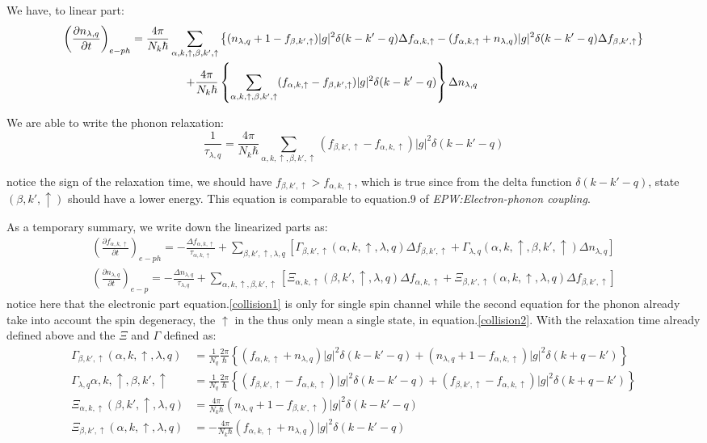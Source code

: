 \documentclass{article}
\newcommand{\pfrac}[2]{\frac{\partial #1}{\partial #2}}
\newcommand{\fak}{f_{\alpha,k,\uparrow}}
\newcommand{\fbk}{f_{\beta,k',\uparrow}}
\newcommand{\nlq}{n_{\lambda,q}}
\newcommand{\ak}{\alpha,k,\uparrow}
\newcommand{\bk}{\beta,k',\uparrow}
\newcommand{\ql}{\lambda,q}
\begin{document}
We have, to linear part:
\begin{align}
    \left(\pfrac{\nlq}{t}\right)_{e-ph} = \frac{4\pi}{N_k\hbar}\sum_{\ak,\bk} & \left\{ (\nlq+1-\fbk)|g|^2\delta(k-k'-q)\Delta\fak - (\fak+\nlq)|g|^2\delta(k-k'-q)\Delta\fbk \right\} \notag \\
                    +\frac{4\pi}{N_k\hbar}& \left\{ \sum_{\ak,\bk}(\fak-\fbk)|g|^2\delta(k-k'-q) \right\} \Delta\nlq
\end{align}

We are able to write the phonon relaxation:
\begin{equation}
    \frac{1}{\tau_{\ql}} = \frac{4\pi}{N_k\hbar} \sum_{\ak,\bk}(\fbk-\fak)|g|^2\delta(k-k'-q) 
\end{equation}

notice the sign of the relaxation time, we should have $\fbk > \fak$, which is true since from the delta function $\delta(k-k'-q)$, 
state $(\bk)$ should have a lower energy. This equation is comparable to equation.9 of \emph{EPW:Electron-phonon coupling}. 

As a temporary summary, we write down the linearized parts as:
\begin{align}
    \left(\pfrac{\fak}{t}\right)_{e-ph} = - \frac{\Delta \fak}{\tau_{\ak}} 
         +\sum_{\bk,\ql} \left[ \varGamma_{\bk}(\ak,\ql)\Delta\fbk 
           +\varGamma_{\ql}(\ak,\bk)\Delta\nlq \right]  \label{collision1} \\
    \left(\pfrac{\nlq}{t}\right)_{e-p} = - \frac{\Delta\nlq}{\tau_{\ql}}
        + \sum_{\ak,\bk} \left[ \varXi_{\ak}(\bk,\ql)\Delta \fak 
                              + \varXi_{\bk}(\ak,\ql)\Delta\fbk \right] \label{collision2}
\end{align} 
notice here that the electronic part equation.\ref{collision1} is only for single spin channel while 
the second equation for the phonon already take into account the spin degeneracy, the $\uparrow$ in the 
thus only mean a single state, in equation.\ref{collision2}.
With the relaxation time already defined above and the $\varXi$ and $\varGamma$ defined as:
\begin{align}
    \varGamma_{\bk}(\ak,\ql) &= \frac{1}{N_q}\frac{2\pi}{\hbar}\left\{ (\fak+\nlq)|g|^2\delta(k-k'-q) + (\nlq+1-\fak)|g|^2\delta(k+q-k') \right\} \\
    \varGamma_{\ql}{\ak,\bk} &= \frac{1}{N_q}\frac{2\pi}{\hbar}\left\{ (\fbk-\fak)|g|^2\delta(k-k'-q) + (\fbk-\fak)|g|^2\delta(k+q-k')   \right\} \\
    \varXi_{\ak}(\bk,\ql) &= \frac{4\pi}{N_k\hbar} (\nlq+1-\fbk)|g|^2\delta(k-k'-q) \\
    \varXi_{\bk}(\ak,\ql) &= -\frac{4\pi}{N_k\hbar} (\fak+\nlq)|g|^2\delta(k-k'-q)
\end{align}
\end{document}
